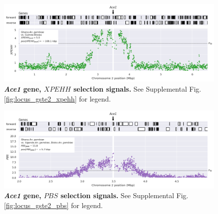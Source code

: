 \documentclass[a4paper,11pt,abstracton,hidelinks]{scrartcl}
\begin{document}
\clearpage


\begin{figure}[t!]
	\begin{center}
		\includegraphics*[width=1\linewidth,center]{artwork/locus_ace1_xpehh_pdist.png}
	\end{center}
	\caption[\textit{Ace1} gene, $XPEHH$ selection signals]{
	\textbf{\textit{Ace1} gene, $XPEHH$ selection signals.}
	See Supplemental Fig. \ref{fig:locus_gste2_xpehh} for legend.
	} 
	\label{fig:locus_ace1_xpehh}
\end{figure}


\clearpage


\begin{figure}[t!]
	\begin{center}
		\includegraphics*[width=1\linewidth,center]{artwork/locus_ace1_pbs_pdist.png}
	\end{center}
	\caption[\textit{Ace1} gene, $PBS$ selection signals]{
	\textbf{\textit{Ace1} gene, $PBS$ selection signals.}
	See Supplemental Fig. \ref{fig:locus_gste2_pbs} for legend.
	} 
	\label{fig:locus_ace1_pbs}
\end{figure}



\clearpage
\end{document}
